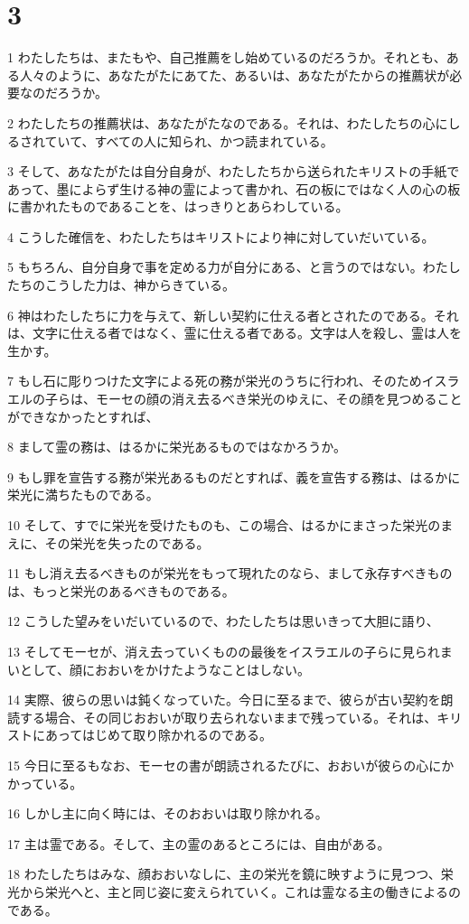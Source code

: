 \chapter{3}

\par 1 わたしたちは、またもや、自己推薦をし始めているのだろうか。それとも、ある人々のように、あなたがたにあてた、あるいは、あなたがたからの推薦状が必要なのだろうか。
\par 2 わたしたちの推薦状は、あなたがたなのである。それは、わたしたちの心にしるされていて、すべての人に知られ、かつ読まれている。
\par 3 そして、あなたがたは自分自身が、わたしたちから送られたキリストの手紙であって、墨によらず生ける神の霊によって書かれ、石の板にではなく人の心の板に書かれたものであることを、はっきりとあらわしている。
\par 4 こうした確信を、わたしたちはキリストにより神に対していだいている。
\par 5 もちろん、自分自身で事を定める力が自分にある、と言うのではない。わたしたちのこうした力は、神からきている。
\par 6 神はわたしたちに力を与えて、新しい契約に仕える者とされたのである。それは、文字に仕える者ではなく、霊に仕える者である。文字は人を殺し、霊は人を生かす。
\par 7 もし石に彫りつけた文字による死の務が栄光のうちに行われ、そのためイスラエルの子らは、モーセの顔の消え去るべき栄光のゆえに、その顔を見つめることができなかったとすれば、
\par 8 まして霊の務は、はるかに栄光あるものではなかろうか。
\par 9 もし罪を宣告する務が栄光あるものだとすれば、義を宣告する務は、はるかに栄光に満ちたものである。
\par 10 そして、すでに栄光を受けたものも、この場合、はるかにまさった栄光のまえに、その栄光を失ったのである。
\par 11 もし消え去るべきものが栄光をもって現れたのなら、まして永存すべきものは、もっと栄光のあるべきものである。
\par 12 こうした望みをいだいているので、わたしたちは思いきって大胆に語り、
\par 13 そしてモーセが、消え去っていくものの最後をイスラエルの子らに見られまいとして、顔におおいをかけたようなことはしない。
\par 14 実際、彼らの思いは鈍くなっていた。今日に至るまで、彼らが古い契約を朗読する場合、その同じおおいが取り去られないままで残っている。それは、キリストにあってはじめて取り除かれるのである。
\par 15 今日に至るもなお、モーセの書が朗読されるたびに、おおいが彼らの心にかかっている。
\par 16 しかし主に向く時には、そのおおいは取り除かれる。
\par 17 主は霊である。そして、主の霊のあるところには、自由がある。
\par 18 わたしたちはみな、顔おおいなしに、主の栄光を鏡に映すように見つつ、栄光から栄光へと、主と同じ姿に変えられていく。これは霊なる主の働きによるのである。

